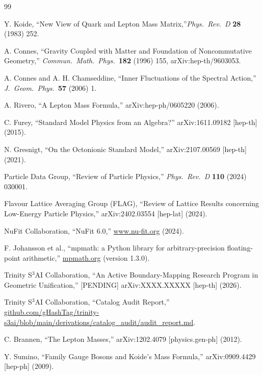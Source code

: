 \documentclass[11pt,a4paper]{article}
\begin{document}
\begin{thebibliography}{99}

Y. Koide, ``New View of Quark and Lepton Mass Matrix,''\n  \textit{Phys.\ Rev.\ D} \textbf{28} (1983) 252.

A. Connes, ``Gravity Coupled with Matter and Foundation of
  Noncommutative Geometry,'' \textit{Commun.\ Math.\ Phys.}\ \textbf{182}
  (1996) 155, arXiv:hep-th/9603053.

A. Connes and A. H. Chamseddine, ``Inner Fluctuations of the Spectral
  Action,'' \textit{J.\ Geom.\ Phys.}\ \textbf{57} (2006) 1.

A. Rivero, ``A Lepton Mass Formula,'' arXiv:hep-ph/0605220 (2006).

C. Furey, ``Standard Model Physics from an Algebra?''
  arXiv:1611.09182 [hep-th] (2015).

N. Gresnigt, ``On the Octonionic Standard Model,'' arXiv:2107.00569
  [hep-th] (2021).

Particle Data Group, ``Review of Particle Physics,''
  \textit{Phys.\ Rev.\ D} \textbf{110} (2024) 030001.

Flavour Lattice Averaging Group (FLAG),
  ``Review of Lattice Results concerning Low-Energy Particle Physics,''
  arXiv:2402.03554 [hep-lat] (2024).

NuFit Collaboration, ``NuFit 6.0,'' \url{www.nu-fit.org} (2024).

F. Johansson et al., ``mpmath: a Python library for arbitrary-precision
  floating-point arithmetic,'' \url{mpmath.org} (version 1.3.0).

Trinity S$^3$AI Collaboration, ``An Active Boundary-Mapping Research Program in
  Geometric Unification,'' [PENDING] arXiv:XXXX.XXXXX [hep-th] (2026).

Trinity S$^3$AI Collaboration, ``Catalog Audit Report,''
  \url{github.com/gHashTag/trinity-s3ai/blob/main/derivations/catalog_audit/audit_report.md}.

C. Brannen, ``The Lepton Masses,'' arXiv:1202.4079 [physics.gen-ph] (2012).

Y. Sumino, ``Family Gauge Bosons and Koide's Mass Formula,''
  arXiv:0909.4429 [hep-ph] (2009).


\end{thebibliography}
\end{document}
